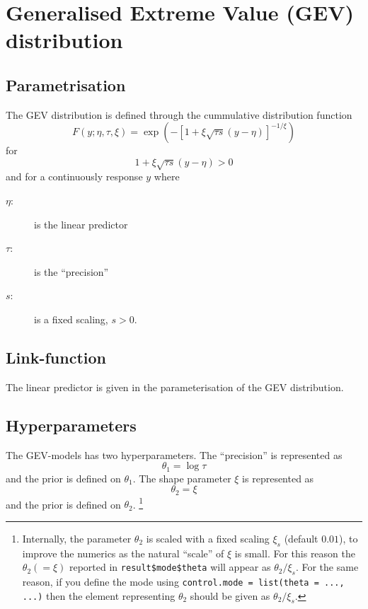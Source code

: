 \documentclass[a4paper,11pt]{article}
\begin{document}
\section*{Generalised Extreme Value (GEV) distribution}

\subsection*{Parametrisation}

The GEV distribution is defined through the cummulative distribution
function
\begin{displaymath}
    F(y; \eta, \tau, \xi) =
    \exp\left(
      - \left[ 1 + \xi \sqrt{\tau s} (y-\eta)\right]^{-1/\xi}
    \right)
\end{displaymath}
for
\begin{displaymath}
    1 + \xi \sqrt{\tau s} (y-\eta) > 0
\end{displaymath}
and for a continuously response $y$ where
\begin{description}
\item[$\eta$:] is the linear predictor
\item[$\tau$:] is the ``precision''
\item[$s$:] is a fixed scaling, $s>0$.    
\end{description}

\subsection*{Link-function}

The linear predictor is given in the parameterisation of the GEV
distribution.

\subsection*{Hyperparameters}

The GEV-models has two hyperparameters.
The ``precision'' is represented as
\begin{displaymath}
    \theta_{1} = \log \tau
\end{displaymath}
and the prior is defined on $\theta_{1}$.  The shape parameter $\xi$
is represented as
\begin{displaymath}
    \theta_{2} = \xi 
\end{displaymath}
and the prior is defined on $\theta_{2}$.  \footnote{Internally, the
    parameter $\theta_{2}$ is scaled with a fixed scaling $\xi_{s}$
    (default $0.01$), to improve the numerics as the natural ``scale''
    of $\xi$ is small. For this reason the $\theta_{2} (=\xi)$
    reported in \texttt{result\$mode\$theta} will appear as
    $\theta_{2}/\xi_{s}$. For the same reason, if you define the mode
    using \texttt{control.mode = list(theta = ..., ...)} then the
    element representing $\theta_{2}$ should be given as $\theta_{2} /
    \xi_{s}$.}
\end{document}
